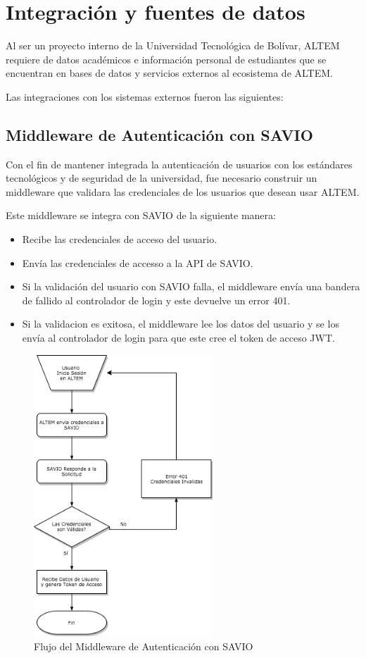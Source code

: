 \chapter{Integración y fuentes de datos}
Al ser un proyecto interno de la Universidad Tecnológica de Bolívar, ALTEM requiere de datos académicos e información personal de estudiantes que se encuentran en bases de datos y servicios externos al ecosistema de ALTEM.

Las integraciones con los sistemas externos fueron las siguientes:

\section{Middleware de Autenticación con SAVIO}
Con el fin de mantener integrada la autenticación de usuarios con los estándares tecnológicos y de seguridad de la universidad, fue necesario construir un middleware que validara las credenciales de los usuarios que desean usar ALTEM.

Este middleware se integra con SAVIO de la siguiente manera:
\begin{itemize}
    \item Recibe las credenciales de acceso del usuario.
    \item Envía las credenciales de accesso a la API de SAVIO.
    \item Si la validación del usuario con SAVIO falla, el middleware envía una bandera de fallido al controlador de login y este devuelve un error 401.
    \item Si la validacion es exitosa, el middleware lee los datos del usuario y se los envía al controlador de login para que este cree el token de acceso JWT.
\end{itemize}

\begin{figure}[H]
    \centering
    \includegraphics[width=0.6\textwidth]{img/savio_auth.png}
    \caption{Flujo del Middleware de Autenticación con SAVIO }
\end{figure}

